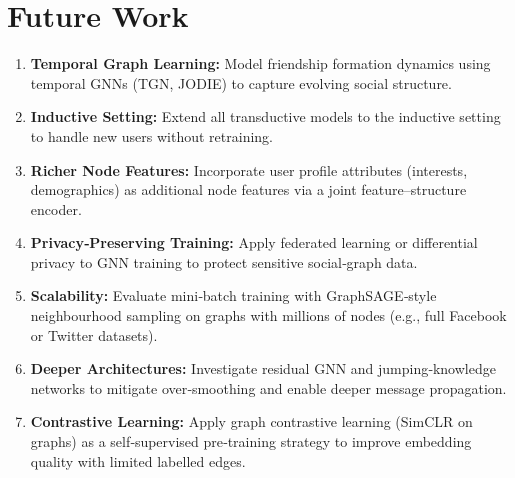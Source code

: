 \documentclass[conference]{IEEEtran}
\begin{document}
\section{Future Work}\label{sec:future}
\begin{enumerate}
  \item \textbf{Temporal Graph Learning:} Model friendship formation dynamics using temporal GNNs (TGN, JODIE) to capture evolving social structure.
  \item \textbf{Inductive Setting:} Extend all transductive models to the inductive setting to handle new users without retraining.
  \item \textbf{Richer Node Features:} Incorporate user profile attributes (interests, demographics) as additional node features via a joint feature–structure encoder.
  \item \textbf{Privacy‑Preserving Training:} Apply federated learning or differential privacy to GNN training to protect sensitive social‑graph data.
  \item \textbf{Scalability:} Evaluate mini‑batch training with GraphSAGE‑style neighbourhood sampling on graphs with millions of nodes (e.g., full Facebook or Twitter datasets).
  \item \textbf{Deeper Architectures:} Investigate residual GNN and jumping‑knowledge networks to mitigate over‑smoothing and enable deeper message propagation.
  \item \textbf{Contrastive Learning:} Apply graph contrastive learning (SimCLR on graphs) as a self‑supervised pre‑training strategy to improve embedding quality with limited labelled edges.
\end{enumerate}
\end{document}
